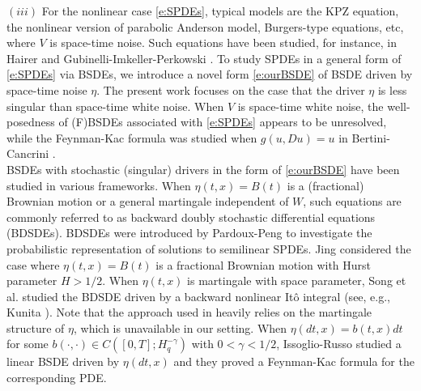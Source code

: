 \documentclass[11pt,reqno]{amsart}
\numberwithin{equation}{section}
\begin{document}
$(iii)$ For the nonlinear case \eqref{e:SPDEs}, typical models are the KPZ equation,  the nonlinear version of parabolic Anderson model, Burgers-type equations, etc, where $V$ is space-time noise. Such equations have been  studied, for instance, in Hairer \cite{Hairer-KPZ} and  Gubinelli-Imkeller-Perkowski \cite{Gubinelli-Imkeller-Perkowski}. To study SPDEs in a general form of \eqref{e:SPDEs} via BSDEs, we introduce a novel form \eqref{e:ourBSDE} of BSDE driven by space-time noise $\eta$.  The present work focuses on the case that the driver $\eta$ is less singular than space-time white noise.  When $V$ is space-time white noise, the well-posedness of (F)BSDEs associated with \eqref{e:SPDEs} appears to be unresolved, while the Feynman-Kac formula was studied when $g(u, Du)=u$ in Bertini-Cancrini \cite{bertini1995stochastic}.\\


BSDEs with stochastic (singular) drivers in the form of \eqref{e:ourBSDE} have been studied in various frameworks. When $\eta(t,x)=B(t)$ is a (fractional) Brownian motion or a general martingale independent of $W$, such equations are commonly referred to as backward doubly stochastic differential equations (BDSDEs). BDSDEs were introduced by Pardoux-Peng \cite{PardouxPeng1994} to investigate the probabilistic representation of solutions to semilinear SPDEs. Jing \cite{Jing-2012} considered the case where $\eta(t,x)=B(t)$ is a fractional Brownian motion with Hurst parameter $H > 1/2$. When $\eta(t,x)$ is  martingale with space parameter, Song et al. \cite{SongSongZhang} studied the BDSDE driven by a backward nonlinear It\^o integral (see, e.g., Kunita \cite{kunita1997stochastic}). Note that the approach used in \cite{SongSongZhang} heavily relies on the martingale structure of $\eta$, which is unavailable in our setting. 
When $\eta(dt,x)=b(t,x)dt$ for some $b(\cdot,\cdot)\in C([0,T];H^{-\gamma}_{q})$ with $0<\gamma<1/2$, Issoglio-Russo \cite{IssoglioRusso} studied a linear BSDE driven by $\eta(dt,x)$ and they proved a Feynman-Kac formula for the corresponding PDE. \\
\end{document}
